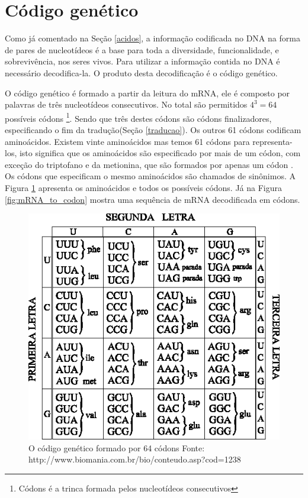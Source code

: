 \section{Código genético}
Como já comentado na Seção \ref{acidos}, a informação codificada no DNA na forma de pares de nucleotídeos é a base para toda a diversidade, funcionalidade, e sobrevivência, nos seres vivos. Para utilizar a informação contida no DNA é necessário decodifica-la. O produto desta decodificação é o código genético.

O código genético é formado a partir da leitura do mRNA, ele é composto por palavras de três nucleotídeos consecutivos. No total são permitidos $4^3 = 64$ possíveis códons \footnote{Códons é a trinca formada pelos nucleotídeos consecutivos}. Sendo que três destes códons são códons finalizadores, especificando o fim da tradução(Seção \ref{traducao}). Os outros 61 códons codificam aminoácidos. Existem vinte aminoácidos mas temos 61 códons para representa-los, isto significa que os aminoácidos são especificado por mais de um códon, com exceção do triptofano e da metionina, que são formados por apenas um códon \cite{Griffiths2000}. Os códons que especificam o mesmo aminoácidos são chamados de sinônimos. A Figura \ref{fig:tab_condos} apresenta os aminoácidos e todos os possíveis códons. Já na Figura \ref{fig:mRNA_to_codon} mostra uma sequência de mRNA decodificada em códons.
 
\begin{figure}[htb!]
    \centering
    \includegraphics[scale=0.7]{./figuras/tab_condos.png}
    \caption{O código genético formado por 64 códons Fonte: http://www.biomania.com.br/bio/conteudo.asp?cod=1238}
    \label{fig:tab_condos}
\end{figure}

